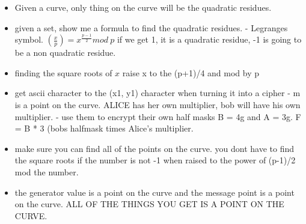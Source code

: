 \documentclass[12pt]{amsart}
\begin{document}
\begin{itemize}
\begin{itemize}
	\item{}Given a curve, only thing on the curve will be the quadratic residues.
	\item{}given a set, show me a formula to find the quadratic residues. - Legranges symbol. $(\frac{x}{p}) = x ^{\frac{p-1}{2}} mod\ p$ if we get 1, it is a quadratic residue, -1 is going to be a non quadratic residue.
	\item{}finding the square roots of $x$ raise x to the (p+1)/4 and mod by p
	\item{}get ascii character to the (x1, y1) character when turning it into a cipher - m is a point on the curve.  ALICE has her own multiplier, bob will have his own multiplier. - use them to encrypt their own half masks B = 4g and A = 3g.  F = B * 3 (bobs halfmask times Alice's multiplier.
	\item{}make sure you can find all of the points on the curve. you dont have to find the square roots if the number is not -1 when raised to the power of (p-1)/2 mod the number.
	\item{}the generator value is a point on the curve and the message point is a point on the curve.  ALL OF THE THINGS YOU GET IS A POINT ON THE CURVE.
	\end{itemize}
\end{itemize}
\end{document}
